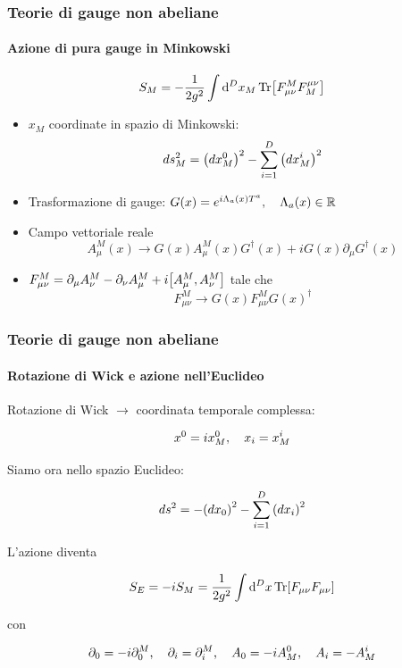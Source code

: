 \documentclass{beamer}
\newcommand{\R}{\mathbb{R}}
\begin{document}
\begin{frame}
	\frametitle{Teorie di gauge non abeliane}
	\framesubtitle{Azione di pura gauge in Minkowski}
	
	\begin{equation*}
		S_M = -\frac{1}{2g^2} \int \dd[D]{x_M} \Tr[F_{\mu\nu}^M F^{\mu\nu}_M]
	\end{equation*}

	\begin{itemize}
		\item $x_M$ coordinate in spazio di Minkowski: $$ds_M^2 = \qty(dx_M^0)^2 - \sum_{i=1}^D \qty(dx_M^i)^2$$
		\item Trasformazione di gauge: $G(x) = e^{i \Lambda_a(x) T^a} \qc \Lambda_a(x) \in \R$
		\item Campo vettoriale reale $$A_\mu^M(x) \rightarrow G(x) A_\mu^M(x) G^\dagger(x) + i G(x) \partial_\mu G^\dagger(x)$$
		\item $F_{\mu\nu}^M = \partial_\mu A_\nu^M - \partial_\nu A_\mu^M + i \qty[A_\mu^M, A_\nu^M]$ tale che
			$$F_{\mu\nu}^M \rightarrow G(x) F_{\mu\nu}^M G(x)^\dagger$$
	\end{itemize}
\end{frame}

\begin{frame}
	\frametitle{Teorie di gauge non abeliane}
	\framesubtitle{Rotazione di Wick e azione nell'Euclideo}
	
	\alert{Rotazione di Wick} $\rightarrow$ coordinata temporale complessa:

	\begin{equation*}
		x^0 = i x^0_M \qc x_i = x^i_M 
	\end{equation*}

	Siamo ora nello spazio Euclideo:

	\begin{equation*}
		ds^2 = -\qty(dx_0)^2 - \sum_{i=1}^D \qty(dx_i)^2
	\end{equation*}

	L'azione diventa

	\begin{equation*}
		S_E = -i S_M = \frac{1}{2g^2} \int \dd[D]{x} \Tr[F_{\mu\nu}F_{\mu\nu}]
	\end{equation*}

	con

	\begin{equation*}
		\partial_0 = -i \partial_0^M \qc \partial_i = \partial_i^M \qc A_0 = -i A^0_M \qc A_i = -A^i_M
	\end{equation*}
\end{frame}
\end{document}
